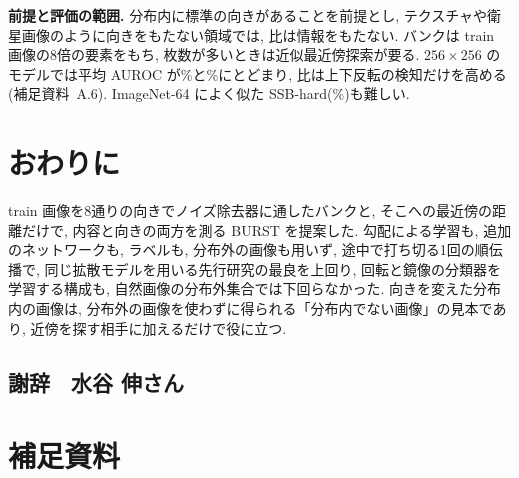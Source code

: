 \documentclass[MIRU,submit]{miru2025j}
\newcommand{\method}{BURST}               %
\begin{document}
\textbf{前提と評価の範囲.} 分布内に標準の向きがあることを前提とし, テクスチャや衛星画像のように向きをもたない領域では, 比は情報をもたない. バンクは train 画像の8倍の要素をもち, 枚数が多いときは近似最近傍探索が要る. $256{\times}256$ のモデルでは平均 AUROC が\nHrLsb\%と\nHrAdm\%にとどまり, 比は上下反転の検知だけを高める(補足資料~A.6). ImageNet-64 によく似た SSB-hard(\nPairSsbT\%)も難しい.

\section{おわりに}
train 画像を8通りの向きでノイズ除去器に通したバンクと, そこへの最近傍の距離だけで, 内容と向きの両方を測る \method{} を提案した. 勾配による学習も, 追加のネットワークも, ラベルも, 分布外の画像も用いず, 途中で打ち切る1回の順伝播で, 同じ拡散モデルを用いる先行研究の最良を上回り, 回転と鏡像の分類器を学習する構成も, 自然画像の分布外集合では下回らなかった. 向きを変えた分布内の画像は, 分布外の画像を使わずに得られる「分布内でない画像」の見本であり, 近傍を探す相手に加えるだけで役に立つ.

\subsection*{{\normalsize 謝辞　水谷 伸さん}}




\onecolumn
\raggedbottom
\setlength{\intextsep}{6pt plus 2pt minus 2pt}
\section*{補足資料}
\renewcommand{\thetable}{A\arabic{table}}\setcounter{table}{0}
\renewcommand{\thefigure}{A\arabic{figure}}\setcounter{figure}{0}
\end{document}
